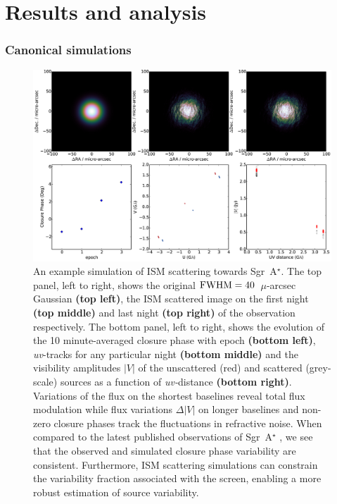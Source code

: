 \chapter{Results and analysis}

\subsection{Canonical simulations}

\begin{figure}
\begin{center}
\includegraphics[width=\columnwidth]{Images/ism}
\caption{An example simulation of ISM scattering towards Sgr~A$^{\star}$.  The top panel, left to right, shows the original $\rm FWHM = 40$~$\mu$-arcsec Gaussian {\bf (top left)}, the ISM scattered image on the first night {\bf (top middle)} and last night {\bf (top right)} of the observation respectively.  The bottom panel, left to right,  shows the evolution of the 10 minute-averaged closure phase with epoch {\bf (bottom left)}, {\sl uv}-tracks for any particular night {\bf (bottom middle)} and the visibility amplitudes $|V|$ of the unscattered (red) and scattered (grey-scale) sources as a function of {\sl uv-}distance {\bf (bottom right)}. Variations of the flux on the shortest baselines reveal total flux modulation while flux variations $\Delta |V|$ on longer baselines and non-zero closure phases track the fluctuations in refractive noise. When compared to the latest published observations of Sgr~A$^{\star}$ \protect\citep{Fish_2016}, we see that the observed and simulated closure phase variability are consistent. Furthermore, ISM scattering simulations can constrain the variability fraction associated with the screen, enabling a more robust estimation of source variability.\label{ISM_sequence}%
}
\end{center}
\end{figure}


